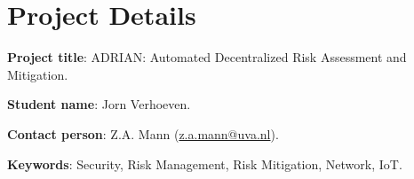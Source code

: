 \section{Project Details}
\hspace{1.15em}
\textbf{Project title}: ADRIAN: Automated Decentralized Risk Assessment and Mitigation.

\textbf{Student name}: Jorn Verhoeven.

\textbf{Contact person}: Z.A. Mann (\href{mailto://z.a.mann@uva.nl}{z.a.mann@uva.nl}).

\textbf{Keywords}: Security, Risk Management, Risk Mitigation, Network, IoT.